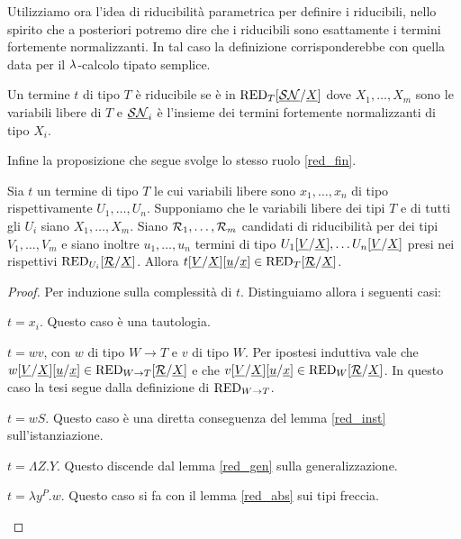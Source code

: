 \documentclass[]{marticle}
\begin{document}
Utilizziamo ora l'idea di riducibilit\`a parametrica per definire i riducibili,
nello spirito che a posteriori potremo dire che i riducibili sono esattamente i
termini fortemente normalizzanti. In tal caso la definizione corrisponderebbe
con quella data per il $\lambda$-calcolo tipato semplice.
\begin{block} [Definizione]
    Un termine $t$ di tipo $T$ \`e riducibile se \`e in
    $\text{RED}_{T}[\underline{\mathcal{SN}}/\underline{X}]$ dove $X_1,\dots,X_m$ sono
    le variabili libere di $T$ e $\underline{\mathcal{SN}}_i$ \`e l'insieme dei
    termini fortemente normalizzanti di tipo $X_i$.
\end{block}

Infine la proposizione che segue svolge lo stesso ruolo \ref{red_fin}.
\begin{block} [Proposizione]
    \label{red_fin}
    Sia $t$ un termine di tipo $T$ le cui variabili libere sono $x_1, \dots,
    x_n$ di tipo rispettivamente $U_1, \dots, U_n$. Supponiamo che le variabili
    libere dei tipi $T$ e di tutti gli $U_i$ siano $X_1, \dots, X_m$. Siano
    $\mathcal{R}_1, \dots, \mathcal{R}_m$ candidati di riducibilit\`a per dei tipi $V_1,
    \dots, V_m$ e siano inoltre $u_1, \dots, u_n$ termini di tipo
    $U_1[\underline{V}/\underline{X}], \dots
    U_n[\underline{V}/\underline{X}]$ presi nei rispettivi
    $\text{RED}_{U_i}[\underline{\mathcal{R}}/\underline{X}]$. Allora $t[\underline{V}/\underline{X}]
    [\underline{u}/\underline{x}] \in \text{RED}_{T}[\underline{\mathcal{R}}/\underline{X}]$.
\newcommand{\subvx}{\sub{\underline{V}}{\underline{X}}}
\newcommand{\subut}{\sub{\underline{u}}{\underline{x}}}
\begin{proof}
    Per induzione sulla complessit\`a di $t$. Distinguiamo allora i seguenti
    casi:
    \begin{nlist}[i]
        \item $t=x_i$. Questo caso \`e una tautologia.
        \item $t=wv$, con $w$ di tipo $W\rightarrow T$ e $v$ di tipo $W$. Per
            ipostesi induttiva vale che $w\subvx\subut\in \red{W \rightarrow
            T}\subrx$ e che $v\subvx\subut \in \red{W}\subrx$. In questo caso la
            tesi segue dalla definizione di $\text{RED}_{W\rightarrow T}$.
        \item $t=wS$. Questo caso \`e una diretta conseguenza del lemma
            \ref{red_inst} sull'istanziazione. 
        \item $t=\Lambda Z. Y$. Questo discende dal lemma \ref{red_gen} sulla
            generalizzazione.
        \item $t=\lambda y^P.w$. Questo caso si fa con il lemma \ref{red_abs} sui tipi
            freccia.
    \end{nlist}
\end{proof}
\end{block}
\end{document}
